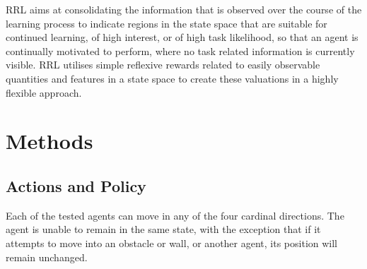 \documentclass{article}
\begin{document}



RRL aims at consolidating the information that is observed over the course of the learning process to indicate regions in the state space that are suitable for continued learning, of high interest, or of high task likelihood, so that an agent is continually motivated to perform, where no task related information is currently visible.
RRL utilises simple reflexive rewards related to easily observable quantities and features in a state space to create these valuations in a highly flexible approach.

\section{Methods\label{Methods}}
\subsection{Actions and Policy\label{Actions_etc}}

Each of the tested agents can move in any of the four cardinal directions. The agent is unable to remain in the same state, with the exception that if it attempts to move into an obstacle or wall, or another agent, its position will remain unchanged. %
\end{document}
